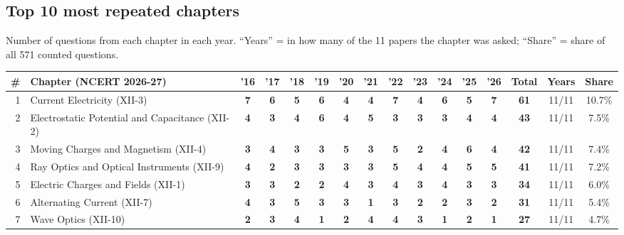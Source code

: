 \documentclass[10pt,a4paper]{article}
\begin{document}
\subsection*{Top 10 most repeated chapters}
{\small Number of questions from each chapter in each year. ``Years'' = in how many of the 11 papers the chapter was asked; ``Share'' = share of all 571 counted questions.}\par\smallskip
{\footnotesize\setlength{\tabcolsep}{2.6pt}\renewcommand{\arraystretch}{1.25}
\begin{tabularx}{\linewidth}{@{}r>{\raggedright\arraybackslash}X*{11}{c}ccc@{}}\toprule
\# & Chapter (NCERT 2026-27) & '16 & '17 & '18 & '19 & '20 & '21 & '22 & '23 & '24 & '25 & '26 & Total & Years & Share\\\midrule
1 & Current Electricity {\scriptsize(XII-3)} & \textbf{7} & \textbf{6} & \textbf{5} & \textbf{6} & \textbf{4} & \textbf{4} & \textbf{7} & \textbf{4} & \textbf{6} & \textbf{5} & \textbf{7} & \textbf{61} & 11/11 & 10.7\%\\
2 & Electrostatic Potential and Capacitance {\scriptsize(XII-2)} & \textbf{4} & \textbf{3} & \textbf{4} & \textbf{6} & \textbf{4} & \textbf{5} & \textbf{3} & \textbf{3} & \textbf{3} & \textbf{4} & \textbf{4} & \textbf{43} & 11/11 & 7.5\%\\
3 & Moving Charges and Magnetism {\scriptsize(XII-4)} & \textbf{3} & \textbf{4} & \textbf{3} & \textbf{3} & \textbf{5} & \textbf{3} & \textbf{5} & \textbf{2} & \textbf{4} & \textbf{6} & \textbf{4} & \textbf{42} & 11/11 & 7.4\%\\
4 & Ray Optics and Optical Instruments {\scriptsize(XII-9)} & \textbf{4} & \textbf{2} & \textbf{3} & \textbf{3} & \textbf{3} & \textbf{3} & \textbf{5} & \textbf{4} & \textbf{4} & \textbf{5} & \textbf{5} & \textbf{41} & 11/11 & 7.2\%\\
5 & Electric Charges and Fields {\scriptsize(XII-1)} & \textbf{3} & \textbf{3} & \textbf{2} & \textbf{2} & \textbf{4} & \textbf{3} & \textbf{4} & \textbf{3} & \textbf{4} & \textbf{3} & \textbf{3} & \textbf{34} & 11/11 & 6.0\%\\
6 & Alternating Current {\scriptsize(XII-7)} & \textbf{4} & \textbf{3} & \textbf{5} & \textbf{3} & \textbf{3} & \textbf{1} & \textbf{3} & \textbf{2} & \textbf{2} & \textbf{3} & \textbf{2} & \textbf{31} & 11/11 & 5.4\%\\
7 & Wave Optics {\scriptsize(XII-10)} & \textbf{2} & \textbf{3} & \textbf{4} & \textbf{1} & \textbf{2} & \textbf{4} & \textbf{4} & \textbf{3} & \textbf{1} & \textbf{2} & \textbf{1} & \textbf{27} & 11/11 & 4.7\%\\

\end{tabularx}}
\end{document}
